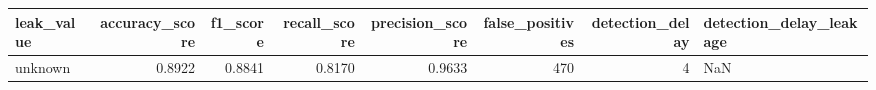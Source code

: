 \begin{tabular}{lrrrrrrl}
\toprule
leak\_value & accuracy\_score & f1\_score & recall\_score & precision\_score & false\_positives & detection\_delay & detection\_delay\_leakage \\
\midrule
unknown & 0.8922 & 0.8841 & 0.8170 & 0.9633 & 470 & 4 & NaN \\
\bottomrule
\end{tabular}
